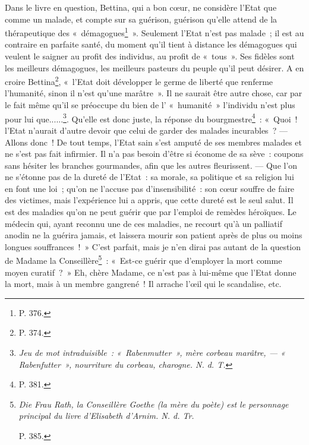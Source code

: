 \documentclass[french,twoside]{book} %
\begin{document}
Dans le livre en question, Bettina, qui a bon cœur, ne considère l’Etat que comme un malade, et compte sur sa guérison, guérison qu’elle attend de la thérapeutique des « démagogues\footnote{ \noindent P. 376.
 } ». Seulement l’Etat n’est pas malade ; il est au contraire en parfaite santé, du moment qu’il tient à distance les démagogues qui veulent le saigner au profit des individus, au profit de « tous ». Ses fidèles sont les meilleurs démagogues, les meilleurs pasteurs du peuple qu’il peut désirer. A en croire Bettina\footnote{ \noindent P. 374.
 }, « l’Etat doit développer le germe de liberté que renferme l’humanité, sinon il n’est qu’une marâtre ». Il ne saurait être autre  chose, car par le fait même qu’il se préoccupe du bien de l’ « humanité » l’individu n’est plus pour lui que......\footnote{ \noindent \emph{Jeu de mot intraduisible : « Rabenmutter », mère corbeau marâtre, — «  Rabenfutter », nourriture du corbeau, charogne. N. d. T.}
 }. Qu’elle est donc juste, la réponse du bourgmestre\footnote{ \noindent P. 381.
 } : « Quoi ! l’Etat n’aurait d’autre devoir que celui de garder des malades incurables ? — Allons donc ! De tout temps, l’Etat sain s’est amputé de ses membres malades et ne s’est pas fait infirmier. Il n’a pas besoin d’être si économe de sa sève : coupons sans hésiter les branches gourmandes, afin que les autres fleurissent. — Que l’on ne s’étonne pas de la dureté de l’Etat : sa morale, sa politique et sa religion lui en font une loi ; qu’on ne l’accuse pas d’insensibilité : son cœur souffre de faire des victimes, mais l’expérience lui a appris, que cette dureté est le seul salut. Il est des maladies qu’on ne peut guérir que par l’emploi de remèdes héroïques. Le médecin qui, ayant reconnu une de ces maladies, ne recourt qu’à un palliatif anodin ne la guérira jamais, et laissera mourir son patient après de plus ou moins longues souffrances ! » C’est parfait, mais je n’en dirai pas autant de la question de Madame la Conseillère\footnote{ \noindent \emph{Die Frau Rath, la Conseillère Goethe (la mère du poète) est le personnage principal du livre d’Elisabeth d’Arnim. N. d. Tr.}\par
 P. 385.
 } : « Est-ce guérir que d’employer la mort comme moyen curatif ? » Eh, chère Madame, ce n’est pas à lui-même que l’Etat donne la mort, mais à un membre gangrené ! Il arrache l’œil qui le scandalise, etc.\par
\end{document}
